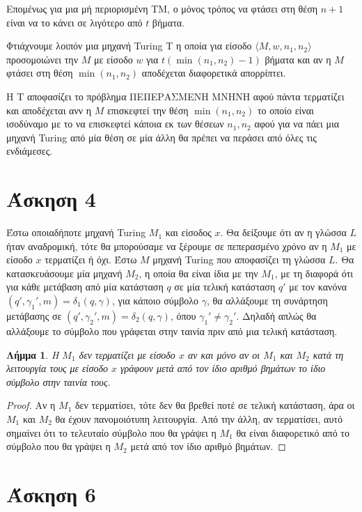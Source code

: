 \documentclass[a4paper, oneside, 11pt]{article}
\newtheorem{lm}[thm]{Λήμμα}
\theoremstyle{definition}
\begin{document}
Επομένως για μια μή περιορισμένη TM, ο μόνος τρόπος να φτάσει στη θέση $n+1$ είναι να
το κάνει σε λιγότερο από $t$ βήματα.

Φτιάχνουμε λοιπόν μια μηχανή Turing T η οποία για είσοδο $\langle M, w, n_1, n_2
\rangle$ προσομοιώνει την $M$ με είσοδο $w$ για $t(\min(n_1, n_2)-1)$ βήματα και αν η
$M$ φτάσει στη θέση $\min(n_1, n_2)$ αποδέχεται διαφορετικά απορρίπτει.

Η T αποφασίζει το πρόβλημα ΠΕΠΕΡΑΣΜΕΝΗ ΜΝΗΝΗ αφού πάντα τερματίζει και αποδέχεται ανν
η $M$ επισκεφτεί την θέση $\min(n_1, n_2)$ το οποίο είναι ισοδύναμο με το να
επισκεφτεί κάποια εκ των θέσεων $n_1, n_2$ αφού για να πάει μια μηχανή Turing από μία
θέση σε μία άλλη θα πρέπει να περάσει από όλες τις ενδιάμεσες.

\section*{Άσκηση 4}

Έστω οποιαδήποτε μηχανή Turing $M_1$ και είσοδος $x$. Θα δείξουμε ότι αν η γλώσσα $L$ ήταν αναδρομική,
τότε θα μπορούσαμε να ξέρουμε σε πεπερασμένο χρόνο αν η $M_1$ με είσοδο $x$ τερματίζει ή όχι.
Έστω $M$ μηχανή Turing που αποφασίζει τη γλώσσα $L$. Θα κατασκευάσουμε μία μηχανή $M_2$, η οποία θα είναι
ίδια με την $M_1$, με τη διαφορά ότι για κάθε μετάβαση από μία κατάσταση $q$ σε μία τελική κατάσταση $q'$ 
με τον κανόνα $(q',\gamma_1',m)=\delta_1(q,\gamma)$, για κάποιο σύμβολο $\gamma$, θα αλλάξουμε τη συνάρτηση
μετάβασης σε $(q',\gamma_2',m)=\delta_2(q,\gamma)$, όπου $\gamma_1'\neq \gamma_2'$. Δηλαδή απλώς θα αλλάξουμε το σύμβολο που γράφεται
στην ταινία πριν από μια τελική κατάσταση.
\begin{lm}
Η $M_1$ δεν τερματίζει με είσοδο $x$ αν και μόνο αν οι $M_1$ και $M_2$ κατά τη λειτουργία τους με είσοδο
$x$ γράφουν μετά από τον ίδιο αριθμό βημάτων το ίδιο σύμβολο στην ταινία τους.
\end{lm}
\begin{proof}
Αν η $Μ_1$ δεν τερματίσει, τότε δεν θα βρεθεί ποτέ σε τελική κατάσταση, άρα οι $Μ_1$ και $Μ_2$ θα έχουν 
πανομοιότυπη λειτουργία.
Από την άλλη, αν τερματίσει, αυτό σημαίνει ότι το τελευταίο σύμβολο που θα γράψει η $Μ_1$ θα είναι 
διαφορετικό από το σύμβολο που θα γράψει η $Μ_2$ μετά από τον ίδιο αριθμό βημάτων.
\end{proof}

\section*{Άσκηση 6}
\end{document}
